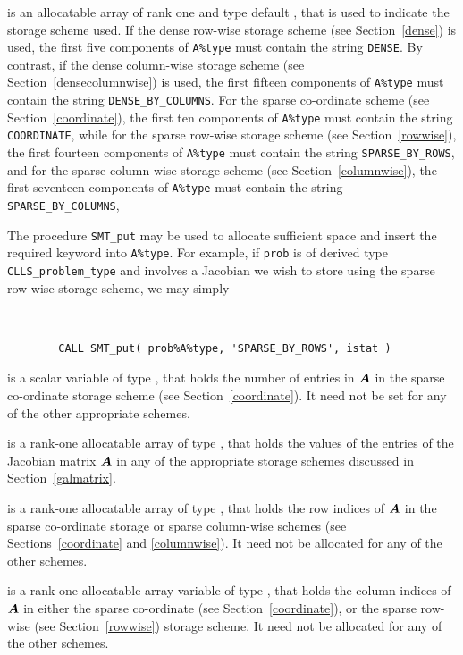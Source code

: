 \documentclass{galahad}
\newcommand{\packagename}{CLLS}
\begin{document}
\begin{description}
\begin{description}
 is an allocatable array of rank one and type default \character,
that is used to indicate the storage scheme used.
If the dense row-wise storage scheme (see Section~\ref{dense}) is used,
the first five components of {\tt A\%type} must contain the
string {\tt DENSE}.
By contrast, if the dense column-wise storage scheme
(see Section~\ref{densecolumnwise}) is used,
the first fifteen components of {\tt A\%type} must contain the
string {\tt DENSE\_BY\_COLUMNS}.
For the sparse co-ordinate scheme (see Section~\ref{coordinate}),
the first ten components of {\tt A\%type} must contain the
string {\tt COORDINATE}, while
for the sparse row-wise storage scheme (see Section~\ref{rowwise}),
the first fourteen components of {\tt A\%type} must contain the
string {\tt SPARSE\_BY\_ROWS},
and for the sparse column-wise storage scheme (see Section~\ref{columnwise}),
the first seventeen components of {\tt A\%type} must contain the
string {\tt SPARSE\_BY\_COLUMNS},

The procedure {\tt SMT\_put} may be used to allocate sufficient space and
insert the required keyword into {\tt A\%type}. For example,
if {\tt prob} is of derived type {\tt \packagename\_problem\_type}
and involves a Jacobian we wish to store using the sparse row-wise
storage scheme, we may simply
{\tt
\begin{verbatim}
        CALL SMT_put( prob%A%type, 'SPARSE_BY_ROWS', istat )
\end{verbatim}
}
\noindent

 is a scalar variable of type \integer, that
holds the number of entries in ${\bm{A}}$
in the sparse co-ordinate storage scheme (see Section~\ref{coordinate}).
It need not be set for any of the other appropriate schemes.

 is a rank-one allocatable array of type \realdp, that holds
the values of the entries of the Jacobian matrix ${\bm{A}}$ in any of the
appropriate storage schemes discussed in Section~\ref{galmatrix}.

 is a rank-one allocatable array of type \integer,
that holds the row indices of ${\bm{A}}$ in the sparse co-ordinate storage
or sparse column-wise schemes
(see Sections~\ref{coordinate} and \ref{columnwise}).
It need not be allocated for any of the other schemes.

 is a rank-one allocatable array variable of type \integer,
that holds the column indices of ${\bm{A}}$ in either the sparse co-ordinate
(see Section~\ref{coordinate}), or the sparse row-wise
(see Section~\ref{rowwise}) storage scheme.
It need not be allocated for any of the other schemes.


\end{description}
\end{description}
\end{document}
